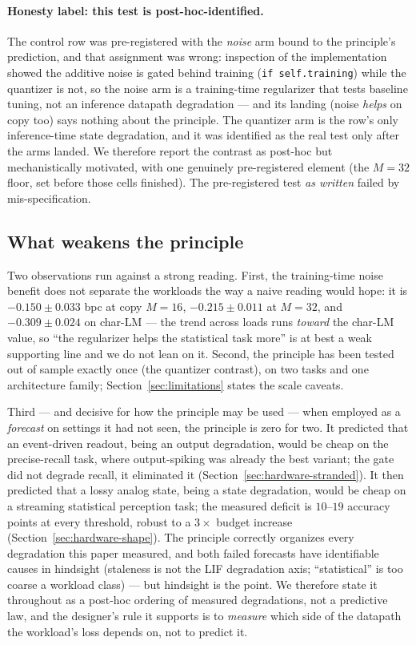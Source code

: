 \paragraph{Honesty label: this test is post-hoc-identified.}
The control row was pre-registered with the \emph{noise} arm bound to the principle's
prediction, and that assignment was wrong: inspection of the implementation showed the
additive noise is gated behind training (\texttt{if self.training}) while the quantizer is
not, so the noise arm is a training-time regularizer that tests baseline tuning, not an
inference datapath degradation --- and its landing (noise \emph{helps} on copy too) says
nothing about the principle. The quantizer arm is the row's only inference-time state
degradation, and it was identified as the real test only after the arms landed. We therefore
report the contrast as post-hoc but mechanistically motivated, with one genuinely
pre-registered element (the $M{=}32$ floor, set before those cells finished). The
pre-registered test \emph{as written} failed by mis-specification.

\subsection{What weakens the principle}
\label{sec:principle-against}

Two observations run against a strong reading. First, the training-time noise benefit does
not separate the workloads the way a naive reading would hope: it is $-0.150 \pm 0.033$ bpc
at copy $M{=}16$, $-0.215 \pm 0.011$ at $M{=}32$, and $-0.309 \pm 0.024$ on char-LM --- the
trend across loads runs \emph{toward} the char-LM value, so ``the regularizer helps the
statistical task more'' is at best a weak supporting line and we do not lean on it. Second,
the principle has been tested out of sample exactly once (the quantizer contrast), on two
tasks and one architecture family; Section~\ref{sec:limitations} states the scale caveats.

Third --- and decisive for how the principle may be used --- when employed as a
\emph{forecast} on settings it had not seen, the principle is zero for two. It predicted
that an event-driven readout, being an output degradation, would be cheap on the
precise-recall task, where output-spiking was already the best variant; the gate did not
degrade recall, it eliminated it (Section~\ref{sec:hardware-stranded}). It then predicted
that a lossy analog state, being a state degradation, would be cheap on a streaming
statistical perception task; the measured deficit is $10$--$19$ accuracy points at every
threshold, robust to a $3\times$ budget increase (Section~\ref{sec:hardware-shape}). The
principle correctly organizes every degradation this paper measured, and both failed
forecasts have identifiable causes in hindsight (staleness is not the LIF degradation
axis; ``statistical'' is too coarse a workload class) --- but hindsight is the point. We
therefore state it throughout as a post-hoc ordering of measured degradations, not a
predictive law, and the designer's rule it supports is to \emph{measure} which side of
the datapath the workload's loss depends on, not to predict it.
